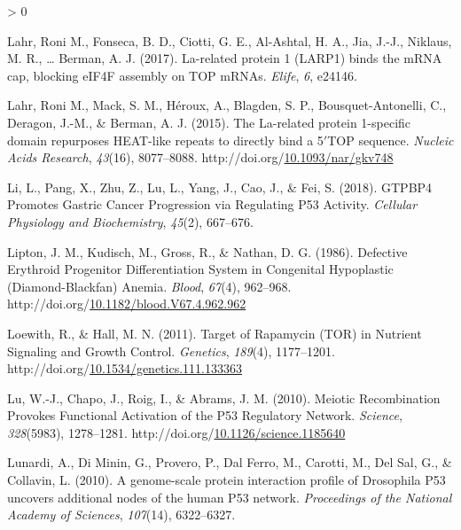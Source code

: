 \documentclass[12pt,oneside]{reedthesis}
\newlength{\cslhangindent}
\newenvironment{CSLReferences}[2] %
 {%
  \setlength{\parindent}{0pt}
  \ifodd #1 \everypar{\setlength{\hangindent}{\cslhangindent}}\ignorespaces\fi
  \ifnum #2 > 0
  \setlength{\parskip}{#2\baselineskip}
  \fi
 }%
 {}
\begin{document}
\begin{CSLReferences}{1}{0}
\leavevmode\hypertarget{ref-Lahr2017b}{}%
Lahr, Roni M., Fonseca, B. D., Ciotti, G. E., Al-Ashtal, H. A., Jia, J.-J., Niklaus, M. R., \ldots{} Berman, A. J. (2017). La-related protein 1 ({LARP1}) binds the {mRNA} cap, blocking {eIF4F} assembly on {TOP mRNAs}. \emph{Elife}, \emph{6}, e24146.

\leavevmode\hypertarget{ref-lahrLarelatedProtein1specific2015}{}%
Lahr, Roni M., Mack, S. M., Héroux, A., Blagden, S. P., Bousquet-Antonelli, C., Deragon, J.-M., \& Berman, A. J. (2015). The {La-related} protein 1-specific domain repurposes {HEAT-like} repeats to directly bind a 5{\({'}\)}{TOP} sequence. \emph{Nucleic Acids Research}, \emph{43}(16), 8077--8088. http://doi.org/\href{https://doi.org/10.1093/nar/gkv748}{10.1093/nar/gkv748}

\leavevmode\hypertarget{ref-Li2018a}{}%
Li, L., Pang, X., Zhu, Z., Lu, L., Yang, J., Cao, J., \& Fei, S. (2018). {GTPBP4 Promotes Gastric Cancer Progression} via {Regulating P53 Activity}. \emph{Cellular Physiology and Biochemistry}, \emph{45}(2), 667--676.

\leavevmode\hypertarget{ref-liptonDefectiveErythroidProgenitor1986}{}%
Lipton, J. M., Kudisch, M., Gross, R., \& Nathan, D. G. (1986). Defective {Erythroid Progenitor Differentiation System} in {Congenital Hypoplastic} ({Diamond-Blackfan}) {Anemia}. \emph{Blood}, \emph{67}(4), 962--968. http://doi.org/\href{https://doi.org/10.1182/blood.V67.4.962.962}{10.1182/blood.V67.4.962.962}

\leavevmode\hypertarget{ref-loewithTargetRapamycinTOR2011}{}%
Loewith, R., \& Hall, M. N. (2011). Target of {Rapamycin} ({TOR}) in {Nutrient Signaling} and {Growth Control}. \emph{Genetics}, \emph{189}(4), 1177--1201. http://doi.org/\href{https://doi.org/10.1534/genetics.111.133363}{10.1534/genetics.111.133363}

\leavevmode\hypertarget{ref-luMeioticRecombinationProvokes2010}{}%
Lu, W.-J., Chapo, J., Roig, I., \& Abrams, J. M. (2010). Meiotic {Recombination Provokes Functional Activation} of the P53 {Regulatory Network}. \emph{Science}, \emph{328}(5983), 1278--1281. http://doi.org/\href{https://doi.org/10.1126/science.1185640}{10.1126/science.1185640}

\leavevmode\hypertarget{ref-Lunardi2010a}{}%
Lunardi, A., Di Minin, G., Provero, P., Dal Ferro, M., Carotti, M., Del Sal, G., \& Collavin, L. (2010). A genome-scale protein interaction profile of {Drosophila} P53 uncovers additional nodes of the human P53 network. \emph{Proceedings of the National Academy of Sciences}, \emph{107}(14), 6322--6327.


\end{CSLReferences}
\end{document}
